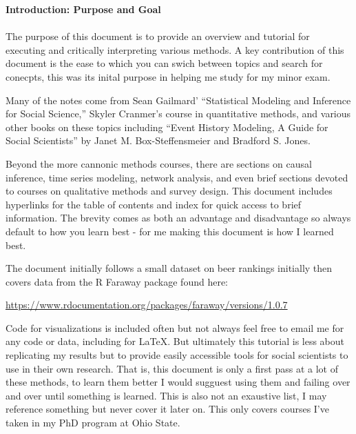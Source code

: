 \documentclass[12pt]{article}\usepackage[]{graphicx}\usepackage[]{color}
\date{\today} %
\begin{document}
\begin{flushleft}
\setlength{\parindent}{1cm} %



\thispagestyle{empty}
\noindent \textbf{Introduction: Purpose and Goal}\\
\hfill \\
The purpose of this document is to provide an overview and tutorial for executing and critically interpreting various methods. A key contribution of this document is the ease to which you can swich between topics and search for conecpts, this was its inital purpose in helping me study for my minor exam.

Many of the notes come from Sean Gailmard' ``Statistical Modeling and Inference for Social Science,'' Skyler Cranmer's course in quantitative methods, and various other books on these topics including ``Event History Modeling, A Guide for Social Scientists'' by Janet M. Box-Steffensmeier and Bradford S. Jones.

Beyond the more cannonic methods courses, there are sections on causal inference, time series modeling, network analysis, and even brief sections devoted to courses on qualitative methods and survey design. This document includes hyperlinks for the table of contents and index for quick access to brief information. The brevity comes as both an advantage and disadvantage so always default to how you learn best - for me making this document is how I learned best.

The document initially follows a small dataset on beer rankings initially then covers data from the R Faraway package found here:

\begin{center}
\url{https://www.rdocumentation.org/packages/faraway/versions/1.0.7}
\end{center}

Code for visualizations is included often but not always feel free to email me for any code or data, including for \LaTeX. But ultimately this tutorial is less about replicating my results but to provide easily accessible tools for social scientists to use in their own research. That is, this document is only a first pass at a lot of these methods, to learn them better I would sugguest using them and failing over and over until something is learned. This is also not an exaustive list, I may reference something but never cover it later on. This only covers courses I've taken in my PhD program at Ohio State.


\end{flushleft}
\end{document}
